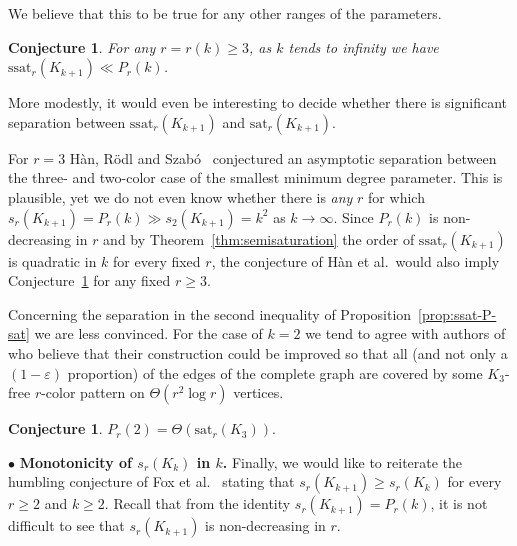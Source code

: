 \documentclass[12pt]{article}
\newcounter{foo}
\newtheorem{conjecture}[foo]{Conjecture}
\theoremstyle{definition}
\begin{document}
We believe that this to be true for any other ranges of the parameters.

\begin{conjecture} \label{con:ssat-P} For any $r=r(k) \geq 3$, as $k$ tends to infinity we have 
		$\mathrm{ssat}_r(K_{k+1})\ll P_r(k)$. 
        \end{conjecture}
    
   	More modestly, it would even be interesting to decide whether there is significant separation between $\mathrm{ssat}_r(K_{k+1})$ and $\mathrm{sat}_r(K_{k+1})$.  
 
For $r=3$ H\`an, R\"odl and Szab\'o~\cite[Conjecture 2]{han}  conjectured an asymptotic separation between the three- and two-color case of the smallest minimum degree parameter. This is plausible, yet we do not even know whether there is {\em any} $r$ for which 
$s_r(K_{k+1}) = P_r(k) \gg s_2(K_{k+1}) = k^2$ as $k \to \infty$. 
Since $P_r(k)$ is non-decreasing in $r$ and by Theorem~\ref{thm:semisaturation} the order of $\mathrm{ssat}_r(K_{k+1})$ is quadratic in $k$ for every fixed $r$, the conjecture of H\`an et al.\ would also imply Conjecture~\ref{con:ssat-P} for any fixed $r\geq 3$.

    Concerning the separation in the second inequality of Proposition~\ref{prop:ssat-P-sat} we are less convinced. For the case of $k=2$ we tend to agree with authors of \cite{guo2020packing} who believe that their construction could be improved so that all (and not only a $(1-\varepsilon)$ proportion) of the edges of the complete graph are covered by some $K_3$-free $r$-color pattern on $\Theta ( r^2\log r)$ vertices. 

\begin{conjecture}
    $P_r(2) = \Theta (\mathrm{sat}_r(K_{3})).$ 
    \end{conjecture}


    
	$\bullet$ {\bf Monotonicity of $s_r(K_k)$ in $k$.} Finally, we would like to reiterate the humbling conjecture of Fox et al.~\cite[Conjecture 5.1]{fox2016minimum} stating that $s_r(K_{k+1}) \geq s_r(K_k)$ for every $r\geq 2$ and $k\geq 2$. Recall that from the identity $s_r(K_{k+1})=P_r(k)$, it is not difficult to see that $s_r(K_{k+1})$ is non-decreasing in $r$. 
	
	
	
\end{document}
